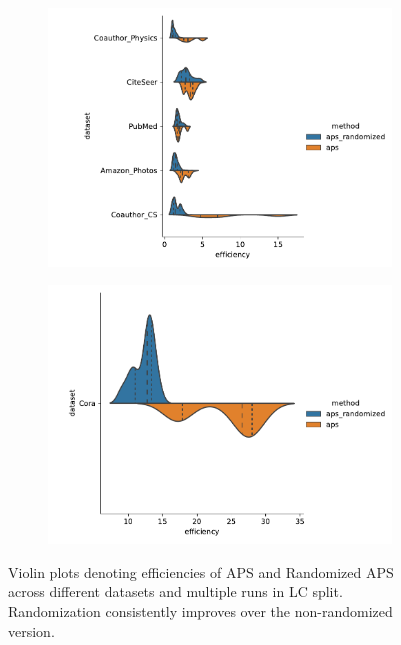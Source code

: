 \begin{figure}
    \centering
    \begin{subfigure}{0.8\linewidth}
    \includegraphics[width=\linewidth]{graphConformal/figures/nspc/aps_randomized_efficiency}
    \end{subfigure}
    \begin{subfigure}{0.6\linewidth}
        \includegraphics[width=\linewidth]{graphConformal/figures/nspc/aps_randomized_efficiency_cora}
    \end{subfigure}
    \caption{Violin plots denoting efficiencies of APS and Randomized APS across different datasets and multiple runs in LC split. Randomization consistently improves over the non-randomized version.}
    \label{fig:nspc:conformal:aps_vs_randomized}
\end{figure}

